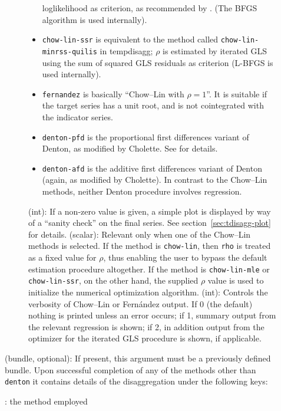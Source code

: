 \begin{description}
\begin{description}
\begin{itemize}
      loglikelihood as criterion, as recommended by
      \cite{bournay79}. (The BFGS algorithm is used internally).
    \item \texttt{chow-lin-ssr} is equivalent to the method called
      \texttt{chow-lin-minrss-quilis} in \textsf{tempdisagg}; $\rho$
      is estimated by iterated GLS using the sum of squared GLS
      residuals as criterion (L-BFGS is used internally).
    \item \texttt{fernandez} is basically ``Chow--Lin with
      $\rho = 1$''. It is suitable if the target series has a unit
      root, and is not cointegrated with the indicator series.
    \item \texttt{denton-pfd} is the proportional first differences
      variant of Denton, as modified by Cholette. See
      \cite{difonzo2012} for details.
    \item \texttt{denton-afd} is the additive first differences
      variant of Denton (again, as modified by Cholette). In
      contrast to the Chow--Lin methods, neither Denton procedure
      involves regression.
    \end{itemize}
  \tditem[plot](int): If a non-zero value is given, a simple
    plot is displayed by way of a ``sanity check'' on the final
    series. See section~\ref{sec:tdisagg-plot} for details.
  \tditem[rho](scalar): Relevant only when one of the Chow--Lin
    methods is selected. If the method is \texttt{chow-lin}, then
    \texttt{rho} is treated as a fixed value for $\rho$, thus enabling
    the user to bypass the default estimation procedure altogether.
    If the method is \texttt{chow-lin-mle} or \texttt{chow-lin-ssr},
    on the other hand, the supplied $\rho$ value is used to initialize
    the numerical optimization algorithm.
  \tditem[verbose](int): Controls the verbosity of Chow--Lin or
    Fern\'andez output. If 0 (the default) nothing is printed unless
    an error occurs; if 1, summary output from the relevant regression
    is shown; if 2, in addition output from the optimizer for the
    iterated GLS procedure is shown, if applicable.
  \end{description}
\tditem[results](bundle, optional): If present, this argument
  must be a previously defined bundle. Upon successful completion of
  any of the methods other than \texttt{denton} it contains details of
  the disaggregation under the following keys:
  \begin{description}
  \tditem[method]: the method employed

\end{description}
\end{description}
